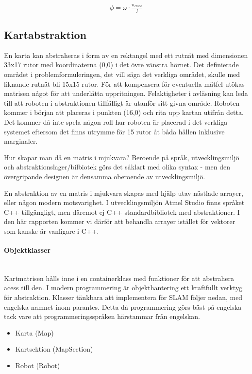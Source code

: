 \documentclass[a4paper,12pt,fleqn]{article}
\begin{document}
\begin{gather}
	\phi = \omega \cdot \frac{n_{clock}}{f}
\end{gather} 

\subsection{Kartabstraktion}

En karta kan abstraheras i form av en rektangel med ett rutnät med dimensionen 33x17 rutor med koordinaterna (0,0) i det övre vänstra hörnet. Det definierade området i problemformuleringen, det vill säga det verkliga området, skulle med liknande rutnät bli 15x15 rutor. För att kompensera för eventuella mätfel utökas matrisen något för att underlätta uppritningen. Felaktigheter i avläsning kan leda till att roboten i abstraktionen tillfälligt är utanför sitt givna område. Roboten kommer i början att placeras i punkten (16,0) och rita upp kartan utifrån detta. Det kommer då inte spela någon roll hur roboten är placerad i det verkliga systemet eftersom det finns utrymme för 15 rutor åt båda hållen inklusive marginaler. 

Hur skapar man då en matris i mjukvara? Beroende på språk, utvecklingsmiljö och abstraktionslager/bilbiotek görs det såklart med olika syntax - men den övergripande designen är densamma oberoende av utvecklingsmiljö. 

En abstraktion av en matris i mjukvara skapas med hjälp utav nästlade arrayer, eller någon modern motsvarighet. I utvecklingsmiljön Atmel Studio finns språket C++ tillgängligt, men däremot ej C++ standardbibliotek med abstraktioner. I den här rapporten kommer vi därför att behandla arrayer istället för vektorer som kanske är vanligare i C++. 

\paragraph{Objektklasser}
~\\
Kartmatrisen hålls inne i en containerklass med funktioner för att abstrahera acess till den. I modern programmering är objekthantering ett kraftfullt verktyg för abstraktion. Klasser tänkbara att implementera för SLAM följer nedan, med engelska namnet inom parantes. Detta då programmering görs bäst på engelska tack vare att programmeringsspråken härstammar från engelskan. 

\begin{itemize}
	\item Karta (Map)
	\item Kartsektion (MapSection)
	\item Robot (Robot)
\end{itemize}
\end{document}
